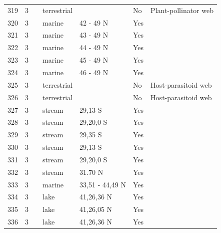 \documentclass[12pt]{article}
\begin{document}
\begin{landscape}
\begin{table}[h!]
{\begin{tabular}{p{2.8cm}p{1.3cm}p{3cm}p{2.2cm}p{2.5cm}lp{8.2cm}}
        319   & 3 & \cite{Kaiser-Bunbury2011}  & terrestrial &       & No    & Plant-pollinator web \\
        320   & 3 & \cite{Ruzicka2012}    & marine & 42 - 49 N & Yes   &       \\
        321   & 3 & \cite{Ruzicka2012}    & marine & 43 - 49 N & Yes   &       \\
        322   & 3 & \cite{Ruzicka2012}    & marine & 44 - 49 N & Yes   &       \\
        323   & 3 & \cite{Ruzicka2012}    & marine & 45 - 49 N & Yes   &       \\
        324   & 3 & \cite{Ruzicka2012}    & marine & 46 - 49 N & Yes   &       \\
        325   & 3 & \cite{Lewis2002}  & terrestrial &       & No    & Host-parasitoid web \\
        326   & 3 & \cite{Lewis2002}  & terrestrial &       & No    & Host-parasitoid web \\
        327   & 3 & \cite{Kelleway2010}  & stream & 29,13 S & Yes   &       \\
        328   & 3 & \cite{Kelleway2010}  & stream & 29,20,0 S & Yes   &       \\
        329   & 3 & \cite{Kelleway2010}  & stream & 29,35 S & Yes   &       \\
        330   & 3 & \cite{Kelleway2010}  & stream & 29,13 S & Yes   &       \\
        331   & 3 & \cite{Kelleway2010}  & stream & 29,20,0 S & Yes   &       \\
        332   & 3 & \cite{Huang2008}  & stream & 31.70 N & Yes   &       \\
        333   & 3 & \cite{Link2002}    & marine & 33,51 - 44,49 N & Yes   &       \\
        334   & 3 & \cite{Alcorlo2001}  & lake  & 41,26,36 N & Yes   &       \\
        335   & 3 & \cite{Alcorlo2001}  & lake  & 41,26,05 N & Yes   &       \\
        336   & 3 & \cite{Alcorlo2001}  & lake  & 41,26,36 N & Yes   &       \\
         \hline
      \end{tabular}}%
      \end{table}

        \newpage


\end{landscape}
\end{document}
